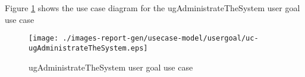 Figure \ref{fig:lu.uni.lassy.excalibur.examples.icrash-RE-UCD-uc-ugAdministrateTheSystem}
shows the use case diagram for the ugAdministrateTheSystem user goal use case

\begin{figure}[htbp]
\begin{center}

\texttt{[image: ./images-report-gen/usecase-model/usergoal/uc-ugAdministrateTheSystem.eps]}
\end{center}
\caption[lu.uni.lassy.excalibur.examples.icrash Use Case Diagram: uc-ugAdministrateTheSystem]{ ugAdministrateTheSystem user goal use case}
\label{fig:lu.uni.lassy.excalibur.examples.icrash-RE-UCD-uc-ugAdministrateTheSystem}
\end{figure}
\vspace{0.5cm}
